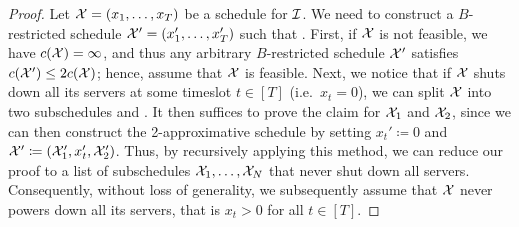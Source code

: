\begin{proof}
Let $\mathcal{X}=(x_1,\dotsc,x_T)$ be a schedule for $\mathcal{I}$. We need to construct a $B$-restricted schedule $\mathcal{X}'=(x_1',\dotsc,x_T')$ such that .
First, if $\mathcal{X}$ is not feasible, we have $c(\mathcal{X})=\infty$, and thus any arbitrary $B$-restricted schedule $\mathcal{X}'$ satisfies $c(\mathcal{X}')\le2c(\mathcal{X})$; hence, assume that $\mathcal{X}$ is feasible. Next, we notice that if $\mathcal{X}$ shuts down all its servers at some timeslot $t\in[T]$ (i.e.\ $x_t=0$), we can split $\mathcal{X}$ into two subschedules  and . It then suffices to prove the claim for $\mathcal{X}_1$ and $\mathcal{X}_2$, since we can then construct the 2-approximative schedule by setting $x_t'\coloneqq 0$ and $\mathcal{X}'\coloneqq(\mathcal{X}_1',x_t',\mathcal{X}_2')$. Thus, by recursively applying this method, we can reduce our proof to a list of subschedules $\mathcal{X}_1,\dotsc,\mathcal{X}_N$ that never shut down all servers. Consequently, without loss of generality, we subsequently assume that $\mathcal{X}$ never powers down all its servers, that is $x_t>0$ for all $t\in[T]$. 
	

\end{proof}
